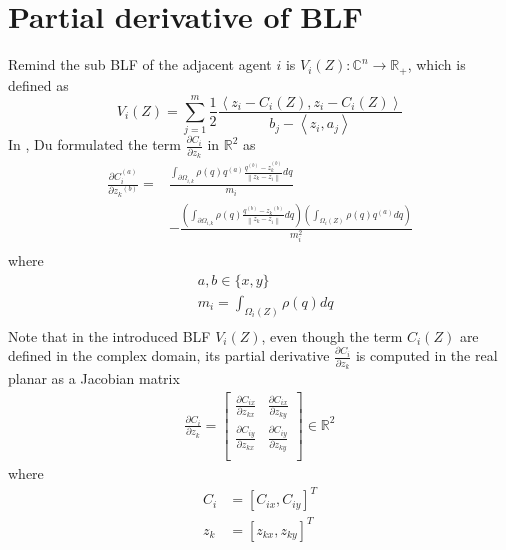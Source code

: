 \documentclass[journal]{IEEEtran}
\newcommand{\norm}[1]{\left\lVert#1\right\rVert}
\begin{document}
	\section{Partial derivative of BLF} \label{appendix:BLF}
	\noindent Remind the sub BLF of the adjacent agent $i$ is $V_i(Z): \mathbb{C}^n \rightarrow \mathbb{R}_+$, which is defined as 
	\[V_i(Z) = \sum^{m}_{j=1} \frac{1}{2} \frac{\left< z_i - C_i(Z), z_i - C_i(Z)\right>}{b_j - \left<z_i, a_j \right>}\] \notag
	\noindent In \cite{Du}, Du formulated the term $\frac{\partial C_i}{\partial z_k}$ in $\mathbb{R}^2$ as 
	\begin{equation} 
	\begin{split}
	\frac{\partial {C}^{(a)}_i}{\partial {z_k}^{(b)}} = & \frac{\int_{\partial \Omega_{i,k}} \rho(q)q^{(a)} \frac{q^{(b)} - {z}^{(b)}_k}{\norm{z_k - z_i}} dq}{m_i} \\ 
	& - \frac{(\int_{\partial \Omega_{i,k}} \rho(q)\frac{q^{(b)} - {z_k}^{(b)}}{\norm{z_k - z_i}} dq)(\int_{\Omega_i(Z)}^{} \rho(q)q^{(a)}dq)}{m_i^2} \\
	\end{split}
	\end{equation}
	where 
	\begin{equation}
	\begin{split}
	& a,b \in \{ x,y \}   \\
	& m_i = \int_{\Omega_{i}(Z)}^{} \rho(q)dq \\ 
	\end{split}
	\end{equation}
	Note that in the introduced BLF $V_{i}(Z)$, even though the term $C_{i}(Z)$ are defined in the complex domain, its partial derivative $\frac{\partial C_i}{\partial z_k}$ is computed in the real planar as a Jacobian matrix 
	\begin{equation} \label{eqn:dVidz}
	\begin{split}
	\frac{\partial C_i}{\partial z_k} = \left [\begin{matrix}
	\frac{\partial C_{ix}}{\partial z_{kx}} & \frac{\partial C_{ix}}{\partial z_{ky}}   \\
	\frac{\partial C_{iy}}{\partial z_{kx}} & \frac{\partial C_{iy}}{\partial z_{ky}} \\
	\end{matrix} \right ] \in \mathbb{R}^2
	\end{split}
	\end{equation}
	where 
	\begin{equation} \label{eqn:dVidz}
	\begin{split}
	C_i & = [C_{ix}, C_{iy}]^T \\
	z_k & = [z_{kx}, z_{ky}]^T \\
	\end{split}
	\end{equation}
	
\end{document}
